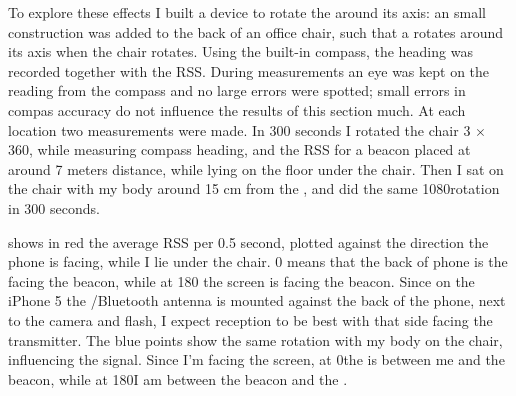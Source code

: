 To explore these effects I built a device to rotate the \device around its axis: an small construction was added to the back of an office chair, such that a \device rotates around its axis when the chair rotates.
Using the built-in compass, the heading was recorded together with the RSS.
During measurements an eye was kept on the reading from the compass and no large errors were spotted; small errors in compas accuracy do not influence the results of this section much.
At each location two measurements were made.
In 300 seconds I rotated the chair 3 $\times$ 360\textdegree, while measuring compass heading, and the RSS for a beacon placed at around 7 meters distance, while lying on the floor under the chair.
Then I sat on the chair with my body around 15 cm from the \device, and did the same 1080\textdegree rotation in 300 seconds.


 shows in red the average RSS per 0.5 second, plotted against the direction the phone is facing, while I lie under the chair.
0\textdegree{} means that the back of phone is the facing the beacon, while at 180\textdegree{} the screen is facing the beacon.
Since on the iPhone 5 the \wifi/Bluetooth antenna is mounted against the back of the phone, next to the camera and flash, I expect reception to be best with that side facing the transmitter.
The blue points show the same rotation with my body on the chair, influencing the signal.
Since I'm facing the screen, at 0\textdegree the \device is between me and the beacon, while at 180\textdegree I am between the beacon and the \device.

